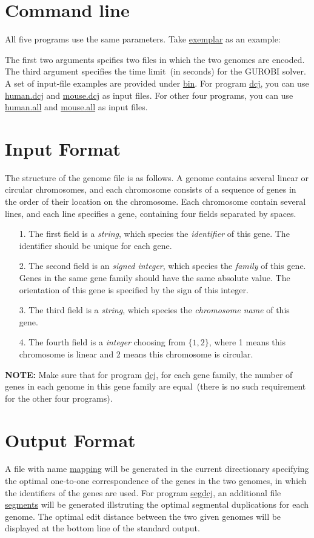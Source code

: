 \documentclass[11pt, a4paper]{article}
\begin{document}
\section{Command line}
All five programs use the same parameters. Take \url{exemplar} as an example:


The first two arguments spcifies two files in which the two genomes are
encoded.  The third argument specifies the time limit~(in seconds) for the
GUROBI solver. A set of input-file examples are provided under \url{bin}.
For program \url{dcj}, you can use \url{human.dcj} and \url{mouse.dcj}
as input files. For other four programs, you can use \url{human.all}
and \url{mouse.all} as input files.

\section{Input Format}
The structure of the genome file is as follows.  A genome contains several
linear or circular chromosomes, and each chromosome consists of a sequence of
genes in the order of their location on the chromosome.  Each chromosome
contain several lines, and each line specifies a gene, containing four fields
separated by spaces.
\begin{itemize}
\item[1.] The first field is a \emph{string}, which species the \emph{identifier} of this gene.
The identifier should be unique for each gene. 
\item[2.] The second field is an \emph{signed integer}, which species the \emph{family} of this gene.
Genes in the same gene family should have the same absolute value.
The orientation of this gene is specified by the sign of this integer.
\item[3.] The third field is a \emph{string}, which species the \emph{chromosome name} of this gene.
\item[4.] The fourth field is a \emph{integer} choosing from $\{1,2\}$, where 1 means this chromosome is linear
and 2 means this chromosome is circular.
\end{itemize}

{\bf NOTE:} Make sure that for program \url{dcj}, for each gene family, the number of genes
in each genome in this gene family are equal~(there is no such requirement for the other
four programs).

\section{Output Format}
A file with name \url{mapping} will be generated in the current
directionary specifying the optimal one-to-one correspondence of the genes in the two genomes,
in which the identifiers of the genes are used. For program \url{segdcj},
an additional file \url{segments} will be generated illstruting the optimal
segmental duplications for each genome.  The optimal edit distance between
the two given genomes will be displayed at the bottom line of the standard
output.
\end{document}
